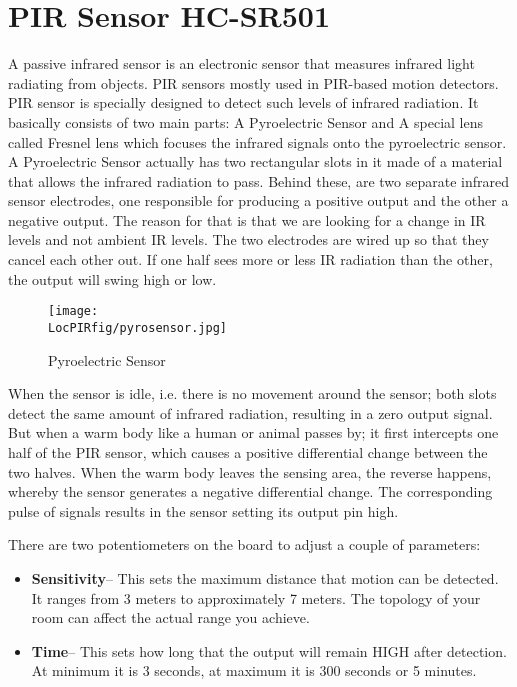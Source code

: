 \section{PIR Sensor HC-SR501}
A passive infrared sensor is an electronic sensor that measures infrared light radiating from objects. PIR sensors mostly used in PIR-based motion detectors.
PIR sensor is specially designed to detect such levels of infrared radiation. It basically consists of two main parts: A Pyroelectric Sensor and A special lens called Fresnel lens which focuses the infrared signals onto the pyroelectric sensor.
A Pyroelectric Sensor actually has two rectangular slots in it made of a material that allows the infrared radiation to pass. Behind these, are two separate infrared sensor electrodes, one responsible for producing a positive output and the other a negative output. The reason for that is that we are looking for a change in IR levels and not ambient IR levels. The two electrodes are wired up so that they cancel each other out. If one half sees more or less IR radiation than the other, the output will swing high or low.


\begin{figure}[hpt]
  \centering
    \texttt{[image: \\LocPIRfig/pyrosensor.jpg]}
    \label{fig:pyro} \hfill
  \caption{Pyroelectric Sensor}
\end{figure}


When the sensor is idle, i.e. there is no movement around the sensor; both slots detect the same amount of infrared radiation, resulting in a zero output signal.
But when a warm body like a human or animal passes by; it first intercepts one half of the PIR sensor, which causes a positive differential change between the two halves. When the warm body leaves the sensing area, the reverse happens, whereby the sensor generates a negative differential change. The corresponding pulse of signals results in the sensor setting its output pin high.

There are two potentiometers on the board to adjust a couple of parameters:
\begin{itemize}
  \item \textbf{Sensitivity}– This sets the maximum distance that motion can be detected. It ranges from 3 meters to approximately 7 meters. The topology of your room can affect the actual range you achieve.
  \item \textbf{Time}– This sets how long that the output will remain HIGH after detection. At minimum it is 3 seconds, at maximum it is 300 seconds or 5 minutes.
\end{itemize}
 
